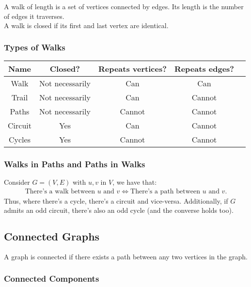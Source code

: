 A walk of length is a set of vertices connected by edges.
Its length is the number of edges it traverses.
\\[\baselineskip]
A walk is closed if its first and last vertex are identical.

\subsubsection{Types of Walks}

\begin{center}
    \begin{tabular} {| c | c | c | c | c |}
        \hline
        Name & Closed? & Repeats vertices? & Repeats edges? \\
        \hline \hline
        Walk        & Not necessarily & Can    & Can    \\ \hline
        Trail       & Not necessarily & Can    & Cannot \\ \hline
        Paths       & Not necessarily & Cannot & Cannot \\ \hline
        Circuit     & Yes             & Can    & Cannot \\ \hline
        Cycles      & Yes             & Cannot & Cannot \\ \hline
    \end{tabular}
\end{center}

\subsubsection{Walks in Paths and Paths in Walks}

Consider $G = (V, E)$ with $u, v$ in $V$, we have that:
\begin{gather*}
  \text{There's a walk between } u \text{ and } v
  \Longleftrightarrow
  \text{There's a path between } u \text{ and } v.
\end{gather*} Thus, where there's a cycle, there's a circuit
and vice-versa.
Additionally, if $G$ admits an odd circuit, there's also
an odd cycle (and the converse holds too).

\subsection{Connected Graphs}

A graph is connected if there exists a path between any two vertices 
in the graph.

\subsubsection{Connected Components}

